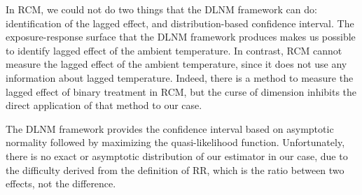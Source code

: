 \documentclass[12pt]{article}
\begin{document}
In RCM, we could not do two things that the DLNM framework can do:
identification of the lagged effect, 
and distribution-based confidence interval.
The exposure-response surface that the DLNM framework produces 
makes us possible to identify lagged effect of the ambient temperature.
In contrast, RCM cannot measure the lagged effect of the ambient temperature,
since it does not use any information about lagged temperature.
Indeed, there is a method to measure the lagged effect of binary treatment in RCM\cite{bojinov2019},
but the curse of dimension inhibits the direct application of that method to our case.

The DLNM framework provides the confidence interval based on asymptotic normality 
followed by maximizing the quasi-likelihood function.
Unfortunately, there is no exact or asymptotic distribution of our estimator in our case,
due to the difficulty derived from the definition of RR, 
which is the ratio between two effects, not the difference.
\end{document}

